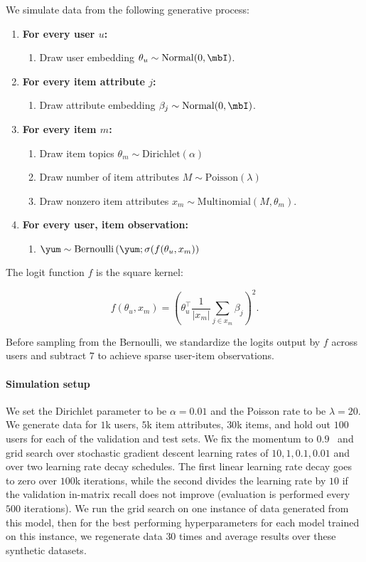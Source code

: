 
We simulate data from the following generative process:

\begin{enumerate}
  \item {\bf For every user $u$:}
    \begin{enumerate}
    \item Draw user embedding $\theta_u \sim \textrm{Normal}(0, \mbI)$.
    \end{enumerate}
  \item {\bf For every item attribute $j$:}
    \begin{enumerate}
    \item Draw attribute embedding $\beta_j \sim \textrm{Normal}(0, \mbI)$.
    \end{enumerate}
  \item {\bf For every item $m$:}
    \begin{enumerate}
    \item Draw item topics $\theta_m \sim \textrm{Dirichlet}(\alpha)$
    \item Draw number of item attributes $M \sim \textrm{Poisson}(\lambda)$
    \item Draw nonzero item attributes $x_m \sim \textrm{Multinomial}(M, \theta_m)$.
    \end{enumerate}
  \item {\bf For every user, item observation:}
    \begin{enumerate}
    \item
      $\yum \sim \textrm{Bernoulli}\left(\yum; \sigma(f(\theta_u, x_m)\right)$
    \end{enumerate}
\end{enumerate}

The logit function $f$ is the square kernel:

$$f(\theta_u, x_m) = \left(\theta_u^\top \frac{1}{|x_m|}\sum_{j \in x_m}
  \beta_j\right)^2.$$

Before sampling from the Bernoulli, we standardize the logits output by $f$
across users and subtract $7$ to achieve sparse user-item observations.

\paragraph{Simulation setup} We set the Dirichlet parameter to be $\alpha=0.01$
and the Poisson rate to be $\lambda=20$. We generate data for $1$k users, $5$k
item attributes, $30$k items, and hold out $100$ users for each of the
validation and test sets. We fix the momentum to
$0.9$~\cite{sutskever2013on-the-importance} and grid search over stochastic
gradient descent learning rates of ${10, 1, 0.1, 0.01}$ and over two learning
rate decay schedules. The first linear learning rate decay goes to zero over
$100$k iterations, while the second divides the learning rate by $10$ if the
validation in-matrix recall does not improve (evaluation is performed every
$500$ iterations). We run the grid search on one instance of data generated from
this model, then for the best performing hyperparameters for each model trained
on this instance, we regenerate data $30$ times and average results over these
synthetic datasets.

